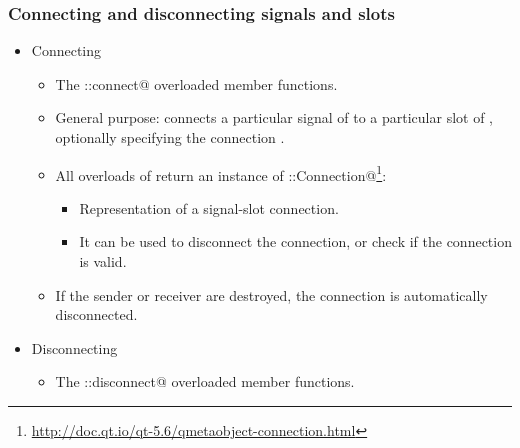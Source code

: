 \begin{frame}[fragile]
  \frametitle{Connecting and disconnecting signals and slots}
   \begin{itemize}
     \item Connecting
     \begin{itemize}
      \item The \verb@QObject::connect@ overloaded member functions.
      \item General purpose: connects a particular signal of \verb@sender@ to a
        particular slot of \verb@receiver@, optionally specifying the connection
        \verb@type@.
      \item All overloads of \verb@connect@ return an instance of
        \verb@QMetaObject::Connection@\footnote
         {\url{http://doc.qt.io/qt-5.6/qmetaobject-connection.html}}:
      \begin{itemize}
        \item Representation of a signal-slot connection.
        \item It can be used to disconnect the connection, or check if
          the connection is valid.
      \end{itemize}
      \item If the sender or receiver are destroyed, the connection is automatically
        disconnected.
     \end{itemize}
     \item Disconnecting
     \begin{itemize}
       \item The \verb@QObject::disconnect@ overloaded member functions.
     \end{itemize}
    \end{itemize}
\end{frame}

